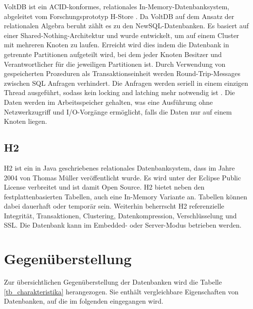 VoltDB \cite{volt2013a} ist ein ACID-konformes, relationales In-Memory-Datenbanksystem, abgeleitet vom Forschungsprototyp H-Store \cite{kallman08}. Da VoltDB auf dem Ansatz der relationalen Algebra beruht zählt es zu den NewSQL-Datenbanken. Es basiert auf einer Shared-Nothing-Architektur und wurde entwickelt, um auf einem Cluster mit mehreren Knoten zu laufen. Erreicht wird dies indem die Datenbank in getrennte Partitionen aufgeteilt wird, bei dem jeder Knoten Besitzer und Verantwortlicher für die jeweiligen Partitionen ist. Durch Verwendung von gespeicherten Prozeduren als Transaktionseinheit werden Round-Trip-Messages zwischen SQL Anfragen verhindert. Die Anfragen werden seriell in einem einzigen Thread ausgeführt, sodass kein locking and latching mehr notwendig ist \cite{volt2013b}. Die Daten werden im Arbeitsspeicher gehalten, was eine Ausführung ohne Netzwerkzugriff und I/O-Vorgänge ermöglicht, falls die Daten nur auf einem Knoten liegen.  

\subsection{H2} 
\label{ch:AnalyseDatenbanken:sec:Datenbanken:subsec:H2}

H2 ist ein in Java geschriebenes relationales Datenbanksystem, dass im Jahre 2004 von Thomas Müller veröffentlicht wurde. Es wird unter der Eclipse Public License verbreitet und ist damit Open Source. H2 bietet neben den festplattenbasierten Tabellen, auch eine In-Memory Variante an. Tabellen können dabei dauerhaft oder temporär sein. Weiterhin beherrscht H2 referenzielle Integrität, Transaktionen, Clustering, Datenkompression, Verschlüsselung und SSL. Die Datenbank kann im Embedded- oder Server-Modus betrieben werden.

\section{Gegenüberstellung} 
\label{ch:AnalyseDatenbanken:sec:Gegenüberstellung}

Zur übersichtlichen Gegenüberstellung der Datenbanken wird die Tabelle \ref{tb_charakteristika} herangezogen. Sie enthält vergleichbare Eigenschaften von Datenbanken, auf die im folgenden eingegangen wird. 

